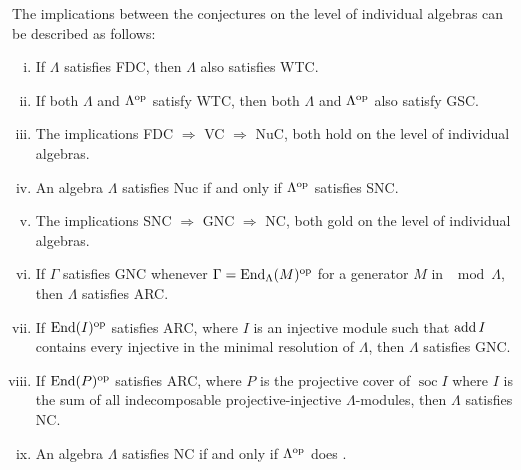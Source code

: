 \begin{prop}\label{prop:conj_on_individual_algebras}
	The implications between the conjectures on the level of individual algebras can be described as follows: 
	\begin{enumerate}[i)]
		\item If $\Lambda$ satisfies FDC, then $\Lambda$ also satisfies WTC.
		\item If both $\Lambda$ and $\Lambda^{\operatorname{op}}$ satisfy WTC, then both $\Lambda$ and $\Lambda^{\operatorname{op}}$ also satisfy GSC.
		\item The implications FDC $\Rightarrow$ VC $\Rightarrow$ NuC, both hold on the level of individual algebras.
		\item An algebra $\Lambda$ satisfies Nuc if and only if $\Lambda^{\operatorname{op}}$ satisfies SNC.
		\item The implications SNC $\Rightarrow$ GNC $\Rightarrow$ NC, both gold on the level of individual algebras.
		\item If $\Gamma$ satisfies GNC whenever $\Gamma = \operatorname{End}_\Lambda(M)^{\operatorname{op}}$ for a generator $M$ in $\mod\Lambda$, then $\Lambda$ satisfies ARC.
		\item If $\operatorname{End}(I)^{\operatorname{op}}$ satisfies ARC, where $I$ is an injective module such that $\operatorname{add} I$ contains every injective in the minimal resolution of $\Lambda$, then $\Lambda$ satisfies GNC.
		\item If $\operatorname{End}(P)^{\operatorname{op}}$ satisfies ARC, where $P$ is the projective cover of $\operatorname{soc}I$ where $I$ is the sum of all indecomposable projective-injective $\Lambda$-modules, then $\Lambda$ satisfies NC. 
		\item An algebra $\Lambda$ satisfies NC if and only if $\Lambda^{\operatorname{op}}$ does \cite[Theorem~4]{Mu68}. 
	\end{enumerate}
\end{prop}

%